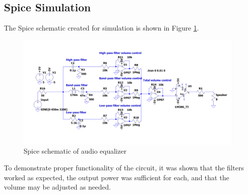 \documentclass[notitlepage, 12pt]{report}
\begin{document}
\subsection*{Spice Simulation}
The Spice schematic created for simulation is shown in 
Figure \ref{fig:spicesim}. 
\begin{figure}
    \caption{Spice schematic of audio equalizer}
    \label{fig:spicesim}
    \begin{center}
        \includegraphics[scale=0.5]{images/spicesim.png}
    \end{center}
\end{figure}
To demonstrate proper functionality of the circuit, 
it was shown that the filters worked as expected, the output power was sufficient 
for each, and that the volume may be adjusted as needed. 
\end{document}
